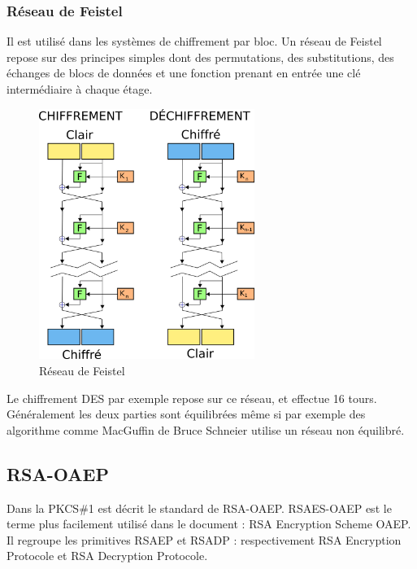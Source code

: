 \subsubsection*{Réseau de Feistel}
Il est utilisé dans les systèmes de chiffrement par bloc. Un réseau de Feistel repose sur des principes simples dont des permutations, des substitutions, des échanges de blocs de données et une fonction prenant en entrée une clé intermédiaire à chaque étage.\\
\begin{figure}[H]
\centering
\includegraphics[width=7cm]{images/Reseau_de_feistel.png}
\caption{Réseau de Feistel}
\label{Feistel}
\end{figure}

Le chiffrement DES par exemple repose sur ce réseau, et effectue 16 tours.\\
Généralement les deux parties sont équilibrées même si par exemple des algorithme comme MacGuffin de Bruce Schneier utilise un réseau non équilibré.

\subsection{RSA-OAEP}
Dans la PKCS\#1 est décrit le standard de RSA-OAEP. RSAES-OAEP est le terme plus facilement utilisé dans le document : RSA Encryption Scheme OAEP.\\
Il regroupe les primitives RSAEP et RSADP : respectivement RSA Encryption Protocole et RSA Decryption Protocole.

